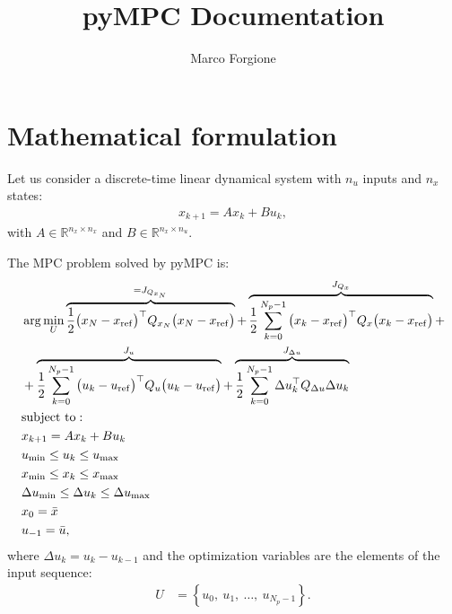 \documentclass[a4paper,12pt,fleqn]{article}
\newcommand{\nin}{n_u}
\newcommand{\nx}{n_x}
\newcommand{\varu}{{U}}
\newcommand{\QxN}{Q_{x_N}}
\newcommand{\Qx}{Q_{x}}
\newcommand{\Qu}{Q_{u}}
\newcommand{\Qdu}{Q_{\Delta u}}
\newcommand{\Np}{{N_p}}
\begin{document}
 \title{pyMPC Documentation}
\author{Marco Forgione}

\maketitle

\section{Mathematical formulation}
Let us consider a discrete-time linear dynamical system with $\nin$ inputs and $\nx$ states:
\begin{align}
 x_{k+1} = A x_{k} + B u_{k},
\end{align}
with $A \in \mathbb{R}^{\nx \times \nx}$ and $B \in \mathbb{R}^{\nx \times \nin}$.

The MPC problem solved by pyMPC is:
\begin{subequations}
\label{eq:MPC}
\begin{align}
  &\arg \min_{\varu} 
  \overbrace{\frac{1}{2}\big(x_N - x_{\rm ref}\big)^\top \QxN \big(x_N - x_{\rm ref}\big)}^{=J_{Q_{x_N}}} + 
  \overbrace{\frac{1}{2}\sum_{k=0}^{\Np-1} \big(x_k - x_{\rm ref}\big)^\top \Qx\big(x_k - x_{\rm ref}\big)}^{J_{Q_x}}+ \nonumber \\
  &  + 
    \overbrace{\frac{1}{2}\sum_{k=0}^{\Np-1} \big(u_k - u_{\rm ref}\big)^\top \Qu \big(u_k - u_{\rm ref}\big)}^{J_u}
    +  
  \overbrace{\frac{1}{2}\sum_{k=0}^{\Np-1} \Delta u_k^\top \Qdu \Delta u_k}^{J_{\Delta u}} \\ \nonumber
  &\text{subject to}: \nonumber\\
  &x_{k+1} = Ax_k + B u_k \label{eq:linear_dynamics} \\ 
  &u_{\rm min} \leq u_k \leq u_{\rm max}\\
  &x_{\rm min} \leq x_k \leq x_{\rm max}\\
  &\Delta u_{\rm min} \leq \Delta u_k \leq \Delta u_{\rm max}\\
  &x_0 = \bar x\\
  &u_{-1} = \bar u,
\end{align}
\end{subequations} where $\Delta u_k = u_k - u_{k-1}$ and the optimization variables are the elements of the input sequence:
\begin{align}
  \varu & = \left\{ u_0,\ u_1,\ \dots, \ u_{\Np-1} \right \}.
\end{align}
\end{document}
